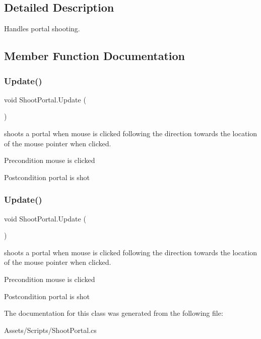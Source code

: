 \subsection{Detailed Description}
Handles portal shooting. 

\subsection{Member Function Documentation}
\mbox{\label{class_shoot_portal_a1160266ce719d6b93655286e0909bae8}} 
\subsubsection{\texorpdfstring{Update()}{Update()}\hspace{0.1cm}{\footnotesize\ttfamily [1/2]}}
{\footnotesize\ttfamily void Shoot\+Portal.\+Update (\begin{DoxyParamCaption}{ }\end{DoxyParamCaption})\hspace{0.3cm}{\ttfamily [inline]}}

shoots a portal when mouse is clicked following the direction towards the location of the mouse pointer when clicked. \begin{DoxyPrecond}{Precondition}
mouse is clicked 
\end{DoxyPrecond}
\begin{DoxyPostcond}{Postcondition}
portal is shot 
\end{DoxyPostcond}
\mbox{\label{class_shoot_portal_a1160266ce719d6b93655286e0909bae8}} 
\subsubsection{\texorpdfstring{Update()}{Update()}\hspace{0.1cm}{\footnotesize\ttfamily [2/2]}}
{\footnotesize\ttfamily void Shoot\+Portal.\+Update (\begin{DoxyParamCaption}{ }\end{DoxyParamCaption})\hspace{0.3cm}{\ttfamily [inline]}}

shoots a portal when mouse is clicked following the direction towards the location of the mouse pointer when clicked. \begin{DoxyPrecond}{Precondition}
mouse is clicked 
\end{DoxyPrecond}
\begin{DoxyPostcond}{Postcondition}
portal is shot 
\end{DoxyPostcond}


The documentation for this class was generated from the following file\+:\begin{DoxyCompactItemize}
\item 
Assets/\+Scripts/Shoot\+Portal.\+cs\end{DoxyCompactItemize}
